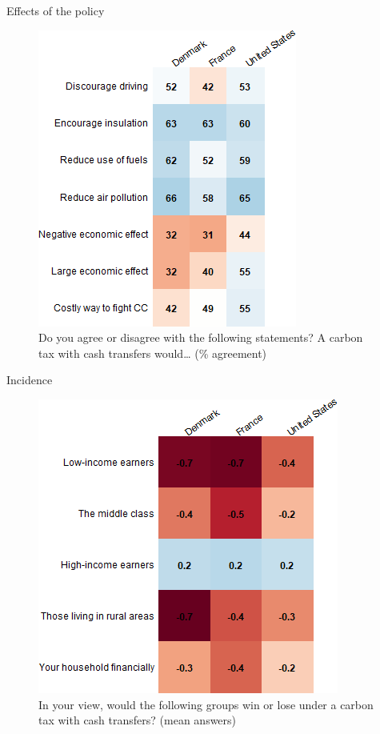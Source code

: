 \documentclass[aspectratio=169,9pt,dvipsnames]{beamer}
\begin{document}
\begin{frame}{Effects of the policy}%


\begin{figure}[h!]
\centering
\caption{Do you agree or disagree with the following statements? A carbon tax with cash transfers would… (\% agreement)}
\includegraphics[width=.4\textwidth]{../figures/country_comparison/tax_transfers_effect_positive_countries.png}
\end{figure}
\end{frame}

\begin{frame}{Incidence}%
\begin{figure}[h!]
\centering
\caption{In your view, would the following groups win or lose under a carbon tax with cash transfers? (mean answers)}
\includegraphics[width=.45\textwidth]{../figures/country_comparison/tax_transfers_win_lose_mean_countries.png}
\end{figure}
\end{frame}
\end{document}
